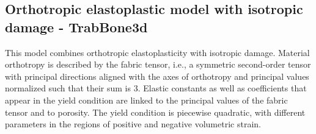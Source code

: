 \documentclass[a4paper]{article}
\begin{document}
\subsection{Orthotropic elastoplastic model with isotropic damage - TrabBone3d}

This model combines orthotropic elastoplasticity with isotropic damage.
Material orthotropy is described by the fabric tensor, i.e., a symmetric second-order
tensor with principal directions aligned with the axes of orthotropy and principal
values normalized such that their sum is 3. Elastic constants as well as coefficients
that appear in the yield condition are linked to the principal values of the
fabric tensor and to porosity. The yield condition is piecewise quadratic,
with different parameters in the regions of positive and negative volumetric strain. 
\end{document}
